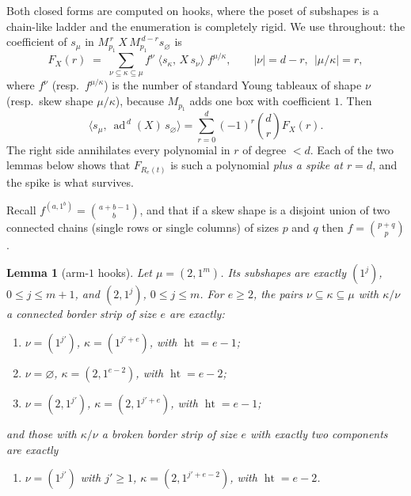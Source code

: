 \documentclass[11pt]{article}
\theoremstyle{plain}
\newtheorem{lemma}[theorem]{Lemma}
\theoremstyle{definition}
\DeclareMathOperator{\hgt}{ht}
\DeclareMathOperator{\ad}{ad}
\begin{document}
Both closed forms are computed on hooks, where the poset of subshapes is a
chain-like ladder and the enumeration is completely rigid.  We use throughout:
the coefficient of $s_\mu$ in $M_{p_1}^{\,r}\,X\,M_{p_1}^{\,d-r}s_\varnothing$ is
\begin{equation}\label{eq:F}
  F_X(r)\;=\;\sum_{\nu\subseteq\kappa\subseteq\mu}
     f^{\nu}\;\langle s_\kappa,\,X\,s_\nu\rangle\;f^{\mu/\kappa},
  \qquad |\nu|=d-r,\ \ |\mu/\kappa|=r,
\end{equation}
where $f^{\nu}$ (resp.\ $f^{\mu/\kappa}$) is the number of standard Young
tableaux of shape $\nu$ (resp.\ skew shape $\mu/\kappa$), because $M_{p_1}$ adds
one box with coefficient $1$.  Then
\begin{equation}\label{eq:diff}
  \langle s_\mu,\ \ad^{\,d}(X)\,s_\varnothing\rangle
  =\sum_{r=0}^{d}(-1)^r\binom{d}{r}F_X(r).
\end{equation}
The right side annihilates every polynomial in $r$ of degree $<d$.  Each of the
two lemmas below shows that $F_{R_e(t)}$ is such a polynomial \emph{plus a
spike at $r=d$}, and the spike is what survives.

Recall $f^{(a,1^b)}=\binom{a+b-1}{b}$, and that if a skew shape is a disjoint
union of two connected chains (single rows or single columns) of sizes $p$ and
$q$ then $f=\binom{p+q}{p}$.

\begin{lemma}[arm-$1$ hooks]\label{lem:hook2}
Let $\mu=(2,1^m)$.  Its subshapes are exactly $(1^j)$, $0\le j\le m+1$, and
$(2,1^j)$, $0\le j\le m$.  For $e\ge2$, the pairs $\nu\subseteq\kappa\subseteq\mu$
with $\kappa/\nu$ a \emph{connected} border strip of size $e$ are exactly:
\begin{enumerate}
\item[(A)] $\nu=(1^{j'})$, $\kappa=(1^{j'+e})$, with $\hgt=e-1$;
\item[(B)] $\nu=\varnothing$, $\kappa=(2,1^{e-2})$, with $\hgt=e-2$;
\item[(C)] $\nu=(2,1^{j'})$, $\kappa=(2,1^{j'+e})$, with $\hgt=e-1$;
\end{enumerate}
and those with $\kappa/\nu$ a broken border strip of size $e$ with exactly two
components are exactly
\begin{enumerate}
\item[(D)] $\nu=(1^{j'})$ with $j'\ge1$, $\kappa=(2,1^{j'+e-2})$, with $\hgt=e-2$.
\end{enumerate}
\end{lemma}
\end{document}
